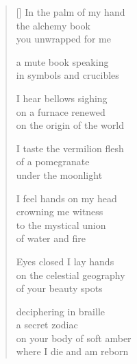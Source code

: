\documentclass[12pt,a4paper]{article}
\begin{document}
\begin{verse}[\versewidth]
  In the palm of my hand \\
  the alchemy book \\
  you unwrapped for me

  a mute book speaking \\
  in symbols and crucibles

  I hear bellows sighing \\
  on a furnace renewed \\
  on the origin of the world

  I taste the vermilion flesh \\
  of a pomegranate \\
  under the moonlight

  I feel hands on my head \\
  crowning me witness \\
  to the mystical union \\
  of water and fire

  Eyes closed I lay hands \\
  on the celestial geography \\
  of your beauty spots

  deciphering in braille \\
  a secret zodiac \\
  on your body of soft amber \\
  where I die and am reborn
\end{verse}


\newpage

\poemtitle{}

\settowidth{\versewidth}{would meet the night immense}

\bigskip
\end{document}
